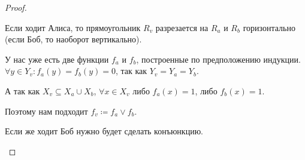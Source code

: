 \begin{proof}
\begin{description}
\begin{itemize}
					Если ходит Алиса, то прямоугольник  $ R_v$ разрезается на   $ R_a$ и  $ R_b$ горизонтально (если  Боб, то наоборот вертикально).

					У нас уже есть две функции  $ f_a$ и  $ f_b$, построенные по предположению индукции.  $ \forall y \in Y_v\colon  f_a(y) = f_b(y) = 0$, так как $ Y_v = Y_a = Y_b$.

					А так как $ X_v \subseteq X_a \cup X_b$, $ \forall x \in X_v$ либо $ f_a(x) = 1$, либо  $ f_b(x) = 1$.

					Поэтому нам подходит  $ f_v \coloneqq f_a \vee f_b$.

					Если же ходит Боб нужно будет сделать конъюнкцию.
			\end{itemize}
    \end{description} 
\end{proof}
